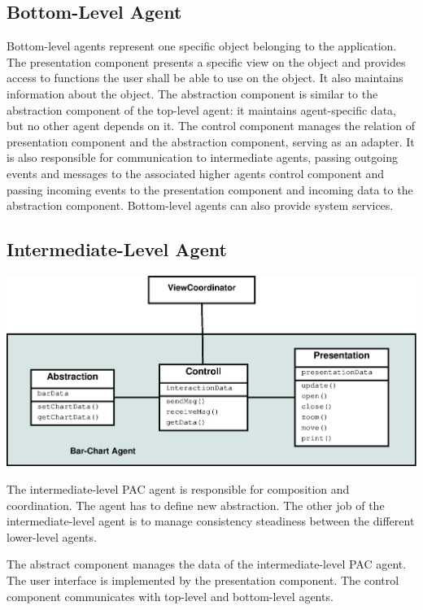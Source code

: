 \documentclass{scrbook}
\begin{document}
\subsection{Bottom-Level Agent}	%


Bottom-level agents represent one specific object belonging to the application. The presentation component presents a specific view on the object and provides access to functions the user shall be able to use on the object. It also maintains information about the object. The abstraction component is similar to the abstraction component of the top-level agent: it maintains agent-specific data, but no other agent depends on it. The control component manages the relation of presentation component and the abstraction component, serving as an adapter. It is also responsible for communication to intermediate agents, passing outgoing events and messages to the associated higher agents control component and passing incoming events to the presentation component and incoming data to the abstraction component. Bottom-level agents can also provide system services. 


\subsection{Intermediate-Level Agent}

\begin{center}
\includegraphics[width=.8\textwidth]{./pics/Components.eps}\end{center}


The intermediate-level PAC agent is responsible for composition and coordination. The agent has to define new abstraction. The other job of the intermediate-level agent is to manage consistency steadiness between the different lower-level agents. 

The abstract component manages the data of the intermediate-level PAC agent. The user interface is implemented by the presentation component. The control component communicates with top-level and bottom-level agents. 
\end{document}
